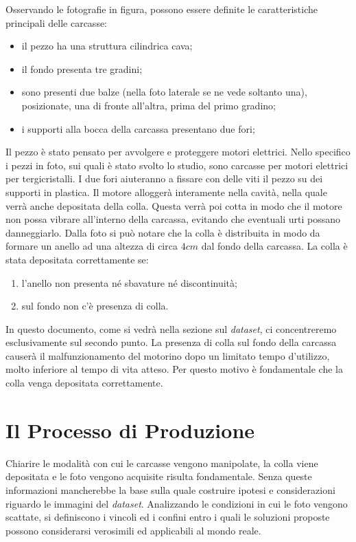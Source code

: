 Osservando le fotografie in figura, possono essere definite le caratteristiche principali delle carcasse:
\begin{itemize}
  \item il pezzo ha una struttura cilindrica cava;
  \item il fondo presenta tre gradini;
  \item sono presenti due balze (nella foto laterale se ne vede soltanto una), posizionate, una di fronte all'altra, prima del primo gradino;
  \item i supporti alla bocca della carcassa presentano due fori;
\end{itemize}
Il pezzo è stato pensato per avvolgere e proteggere motori elettrici.
Nello specifico i pezzi in foto, sui quali è stato svolto lo studio, sono carcasse per motori elettrici per tergicristalli.
I due fori aiuteranno a fissare con delle viti il pezzo su dei supporti in plastica.
Il motore alloggerà interamente nella cavità, nella quale verrà anche depositata della colla.
Questa verrà poi cotta in modo che il motore non possa vibrare all'interno della carcassa, evitando che eventuali urti possano danneggiarlo.
Dalla foto si può notare che la colla è distribuita in modo da formare un anello ad una altezza di circa $4cm$ dal fondo della carcassa.
La colla è stata depositata correttamente se:
\begin{enumerate}
  \item l'anello non presenta né sbavature né discontinuità;
  \item sul fondo non c'è presenza di colla.
\end{enumerate}
In questo documento, come si vedrà nella sezione sul \textit{dataset}, ci concentreremo esclusivamente sul secondo punto.
La presenza di colla sul fondo della carcassa causerà il malfunzionamento del motorino dopo un limitato tempo d'utilizzo, molto inferiore al tempo di vita atteso.
Per questo motivo è fondamentale che la colla venga depositata correttamente.


\section{Il Processo di Produzione}
Chiarire le modalità con cui le carcasse vengono manipolate, la colla viene depositata e le foto vengono acquisite risulta fondamentale.
Senza queste informazioni mancherebbe la base sulla quale costruire ipotesi e considerazioni riguardo le immagini del \textit{dataset}.
Analizzando le condizioni in cui le foto vengono scattate, si definiscono i vincoli ed i confini entro i quali le soluzioni proposte possono considerarsi verosimili ed applicabili al mondo reale.


